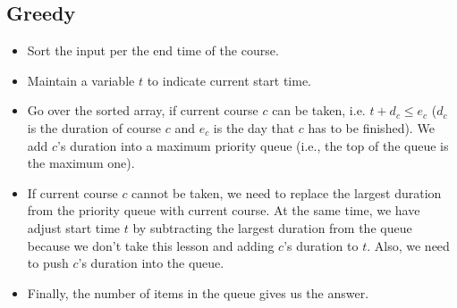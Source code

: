 \subsection{Greedy}
\begin{itemize}
\item Sort the input per the end time of the course.
\item Maintain a variable $t$ to indicate current start time.
\item Go over the sorted array, if current course $c$ can be taken, i.e. $t + d_c \leq e_c$ ($d_c$ is the duration of course $c$ and $e_c$ is the day that $c$ has to be finished). We add $c$'s duration into a maximum priority queue (i.e., the top of the queue is the maximum one). 
\item If current course $c$ cannot be taken, we need to replace the largest duration from the priority queue with current course. At the same time, we have adjust start time $t$ by subtracting the largest duration from the queue because we don't take this lesson and adding $c$'s duration to $t$. Also, we need to push $c$'s duration into the queue.
\item Finally, the number of items in the queue gives us the answer.
\end{itemize}